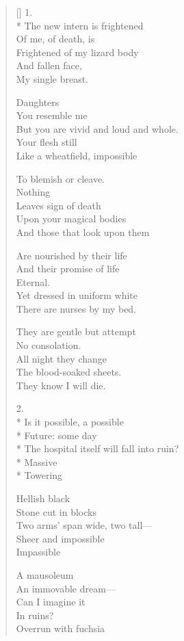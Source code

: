 \label{ch:theknowledge}
\settowidth{\versewidth}{The hospital itself will fall into ruin?}
\begin{verse}[\versewidth]
1.\\*
The new intern is frightened\\
Of me, of death, is\\
Frightened of my lizard body\\
And fallen face,\\
My single breast.

Daughters\\
You resemble me\\
But you are vivid and loud and whole.\\
Your flesh still\\
Like a wheatfield, impossible

To blemish or cleave.\\
Nothing\\
Leaves sign of death\\
Upon your magical bodies\\
And those that look upon them

Are nourished by their life\\
And their promise of life\\
Eternal.\\
Yet dressed in uniform white\\
There are nurses by my bed.

They are gentle but attempt\\
No consolation.\\
All night they change\\
The blood-soaked sheets.\\
They know I will die.

2.\\*
Is it possible, a possible\\*
Future: some day\\*
The hospital itself will fall into ruin?\\*
Massive\\*
Towering

Hellish black\\
Stone cut in blocks\\
Two arms' span wide, two tall---\\
Sheer and impossible\\
Impassible

A mausoleum\\
An immovable dream---\\
Can I imagine it \\
In ruins?\\
Overrun with fuchsia


\end{verse}
